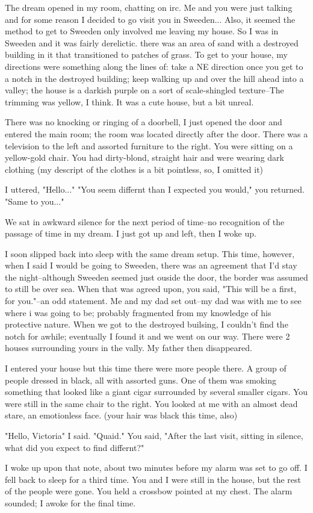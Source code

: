The dream opened in my room, chatting on irc.  Me and you were just talking and for some reason I decided to go visit you in Sweeden... Also, it seemed the method to get to Sweeden only involved me leaving my house.  So I was in Sweeden and it was fairly derelictic.  there was an area of sand with a destroyed building in it that transitioned to patches of grass.  To get to your house, my directions were something along the lines of: take a NE direction once you get to a notch in the destroyed building; keep walking up and over the hill ahead into a valley; the house is a darkish purple on a sort of scale-shingled texture--The trimming was yellow, I think. It was a cute house, but a bit unreal.

There was no knocking or ringing of a doorbell, I just opened the door and entered the main room; the room was located directly after the door. There was a television to the left and assorted furniture to the right.  You were sitting on a yellow-gold chair. You had dirty-blond, straight hair and were wearing dark clothing (my descript of the clothes is a bit pointless, so, I omitted it)

I uttered, "Hello..."
"You seem differnt than I expected you would," you returned.
"Same to you..."

We sat in awkward silence for the next period of time--no recognition of the passage of time in my dream. I just got up and left, then I woke up.

I soon slipped back into sleep with the same dream setup.  This time, however, when I said I would be going to Sweeden, there was an agreement that I'd stay the night--although Sweeden seemed just ouside the door, the border was assumed to still be over sea. When that was agreed upon, you said, "This will be a first, for you."--an odd statement. Me and my dad set out--my dad was with me to see where i was going to be; probably fragmented from my knowledge of his protective nature. When we got to the destroyed builsing, I couldn't find the notch for awhile; eventually I found it and we went on our way.  There were 2 houses surrounding yours in the vally. My father then disappeared.

 I entered your house but this time there were more people there. A group of people dressed in black, all with assorted guns. One of them was smoking something that looked like a giant cigar surrounded by several smaller cigars. You were still in the same chair to the right.  You looked at me with an almost dead stare, an emotionless face. (your hair was black this time, also)

"Hello, Victoria" I said.  
"Quaid." You said, "After the last visit, sitting in silence, what did you expect to find differnt?"

I woke up upon that note, about two minutes before my alarm was set to go off.  I fell back to sleep for a third time. You and I were still in the house, but the rest of the people were gone. You held a crossbow pointed at my chest.  The alarm sounded; I awoke for the final time.

